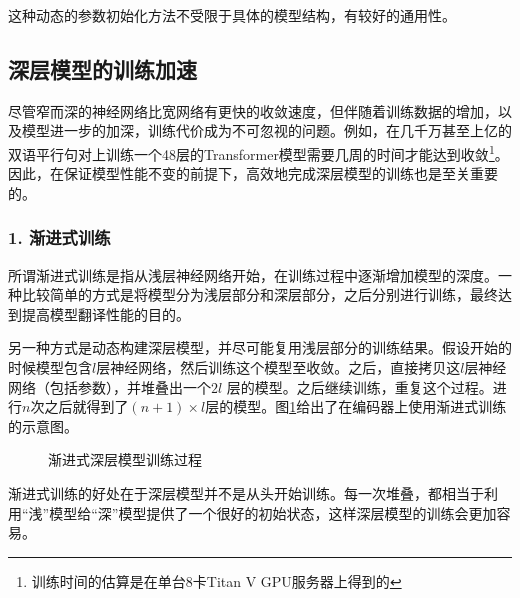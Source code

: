 \parinterval 这种动态的参数初始化方法不受限于具体的模型结构，有较好的通用性。


\subsection{深层模型的训练加速}

\parinterval 尽管窄而深的神经网络比宽网络有更快的收敛速度，但伴随着训练数据的增加，以及模型进一步的加深，训练代价成为不可忽视的问题。例如，在几千万甚至上亿的双语平行句对上训练一个48层的Transformer模型需要几周的时间才能达到收敛\footnote[5]{训练时间的估算是在单台8卡Titan V GPU服务器上得到的}。因此，在保证模型性能不变的前提下，高效地完成深层模型的训练也是至关重要的。


\subsubsection{1. 渐进式训练}

\parinterval 所谓渐进式训练是指从浅层神经网络开始，在训练过程中逐渐增加模型的深度。一种比较简单的方式是将模型分为浅层部分和深层部分，之后分别进行训练，最终达到提高模型翻译性能的目的。

\parinterval 另一种方式是动态构建深层模型，并尽可能复用浅层部分的训练结果。假设开始的时候模型包含$l$层神经网络，然后训练这个模型至收敛。之后，直接拷贝这$l$层神经网络（包括参数），并堆叠出一个$2l$ 层的模型。之后继续训练，重复这个过程。进行$n$次之后就得到了$(n+1) \times l$层的模型。图\ref{fig:15-15}给出了在编码器上使用渐进式训练的示意图。

\begin{figure}[htp]
\centering

\caption{渐进式深层模型训练过程}
\label{fig:15-15}
\end{figure}

\parinterval 渐进式训练的好处在于深层模型并不是从头开始训练。每一次堆叠，都相当于利用“浅”模型给“深”模型提供了一个很好的初始状态，这样深层模型的训练会更加容易。

